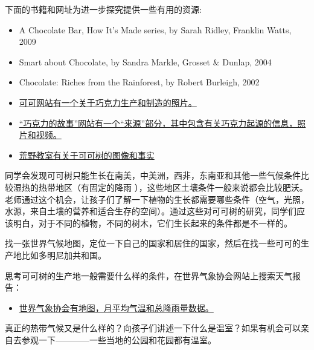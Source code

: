     下面的书籍和网址为进一步探究提供一些有用的资源:\par
    \begin{itemize}
      \item A Chocolate Bar, How It’s Made series, by Sarah Ridley, Franklin Watts, 2009 
      \item Smart about Chocolate, by Sandra Markle, Grosset & Dunlap, 2004 
      \item Chocolate: Riches from the Rainforest, by Robert Burleigh, 2002
      \item \href{http://www.cacaoweb.net/cacao-tree.html}{可可网站有一个关于巧克力生产和制造的照片。}
      \item \href{http://www.candyusa.com/story-of-chocolate/}{“巧克力的故事”网站有一个“来源”部分，其中包含有关巧克力起源的信息，照片和视频。} 
      \item \href{http://www.wildernessclassroom.com/students/archives/2006/03/chocolate_treec.html}{荒野教室有关于可可树的图像和事实}   
    \end{itemize}  
    同学会发现可可树只能生长在南美，中美洲，西非，东南亚和其他一些气候条件比较湿热的热带地区（有固定的降雨 ），这些地区土壤条件一般来说都会比较肥沃。老师通过这个机会，让孩子们了解一下植物的生长都需要哪些条件（空气，光照，水源，来自土壤的营养和适合生存的空间）。通过这些对可可树的研究，同学们应该明白，对于不同的植物，不同的树木，它们生长起来的条件都是不一样的。\par
    找一张世界气候地图，定位一下自己的国家和居住的国家，然后在找一些可可的生产地比如多明尼加共和国。\par
    思考可可树的生产地一般需要什么样的条件，在世界气象协会网站上搜索天气报告：\par
    \begin{itemize}
      \item \href{http://worldweather.wmo.int/index.htm}{世界气象协会有地图，月平均气温和总降雨量数据。}
    \end{itemize}  
    真正的热带气候又是什么样的？向孩子们讲述一下什么是温室？如果有机会可以亲自去参观一下————一些当地的公园和花园都有温室。

